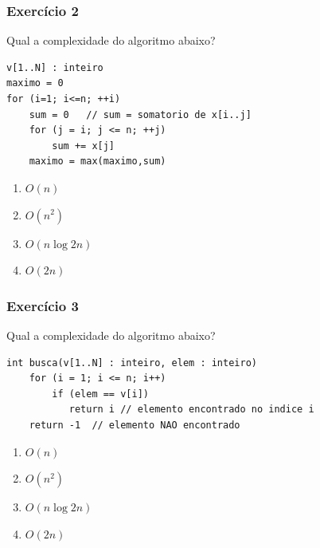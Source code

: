 \documentclass[aspectratio=169]{beamer}
\begin{document}

\begin{frame}[fragile]\frametitle{Exercício 2} %
Qual a complexidade do algoritmo abaixo?
{\scriptsize
\begin{verbatim}
v[1..N] : inteiro
maximo = 0
for (i=1; i<=n; ++i)
    sum = 0   // sum = somatorio de x[i..j]
    for (j = i; j <= n; ++j)
        sum += x[j]
    maximo = max(maximo,sum)
\end{verbatim}
}
\begin{enumerate}[A]
	\item $O(n)$
	\item $O(n^2)$ %
	\item $O(n \log 2n)$
	\item $O(2n)$
\end{enumerate}
\end{frame}

\begin{frame}[fragile]\frametitle{Exercício 3} %
Qual a complexidade do algoritmo abaixo?
{\scriptsize
\begin{verbatim}
int busca(v[1..N] : inteiro, elem : inteiro)
    for (i = 1; i <= n; i++)
        if (elem == v[i])
           return i // elemento encontrado no indice i
    return -1  // elemento NAO encontrado
\end{verbatim}
}
\begin{enumerate}[A]
	\item $O(n)$ %
	\item $O(n^2)$
	\item $O(n \log 2n)$
	\item $O(2n)$
\end{enumerate}
\end{frame}
\end{document}
